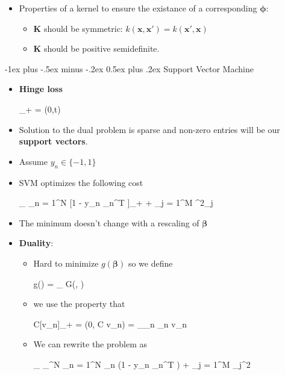 \documentclass[10pt,a4paper,landscape]{article}
\makeatletter
\renewcommand{\section}{\@startsection{section}{1}{0mm}%
                                {-1ex plus -.5ex minus -.2ex}%
                                {0.5ex plus .2ex}%
                                {\normalfont\tiny\bfseries}}
\def\*#1{\mathbf{#1}}
\newenvironment{myalign*}{%
  \setlength{\abovedisplayskip}{2pt}%
  \setlength{\belowdisplayskip}{2pt}%
  \start@align\@ne\st@rredtrue\m@ne
}%
{\endalign}
\makeatother
\begin{document}
\begin{multicols*}{4}
\begin{itemize}
	\item Properties of a kernel to ensure the existance of a corresponding $\bm \phi$:
	\begin{itemize}
		\item $\*K$ should be symmetric: $k(\*x, \*x') = k(\*x', \*x)$
		\item $\* K$ should be positive semidefinite.
	\end{itemize}
\end{itemize}


\section{Support Vector Machine} %
\begin{itemize}
	\item \textbf{Hinge loss}
		\begin{myalign*}
		    [t]_+ = \max(0,t)
		\end{myalign*}
	\item Solution to the dual problem is sparse and non-zero entries will be our \textbf{support vectors}.
	\item Assume $y_n \in \{-1, 1\}$
	\item SVM optimizes the following cost
	\begin{myalign*}
	    \min_{\bm \beta} \sum_{n = 1}^N [1 - y_n \tilde{\bm \phi}_n^T \bm \beta]_+ +  \sum_{j = 1}^M \beta^2_j
	\end{myalign*}
	\item The minimum doesn't change with a rescaling of $\bm \beta$
	\item \textbf{Duality}:
	\begin{itemize}
		\item Hard to minimize $g(\bm \beta)$ so we define
		\begin{myalign*}
		    g(\bm \beta) = \max_{\bm \alpha} G(\bm \beta, \bm \alpha)
		\end{myalign*}
		\item we use the property that
		\begin{myalign*}
		    C[v_n]_+ = \max(0, C v_n) = \max_{\alpha_n \in [0, C]} \alpha_n v_n
		\end{myalign*}
		\item We can rewrite the problem as
		\begin{myalign*}
		    \min_{\bm \beta} \max_{\bm \alpha \in [0, C]^N} \sum_{n = 1}^N \alpha_n (1 - y_n \tilde{\bm \phi}_n^T \bm \beta) +  \sum_{j = 1}^M \beta_j^2

\end{myalign*}
\end{itemize}
\end{itemize}
\end{multicols*}
\end{document}
